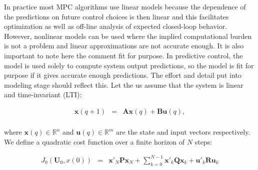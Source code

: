 	\label{BASICCSR:sec:LQR}

In practice most MPC algorithms use linear models because the dependence of the predictions on future control choices is then linear and this facilitates optimization as well as off-line analysis of expected closed-loop behavior. However, nonlinear models can be used where the implied computational burden is not a problem and linear approximations are not accurate enough. It is also important to note here the comment fit for purpose. In predictive control, the model is used solely to compute system output predictions, so the model is fit for purpose if it gives accurate enough predictions. The effort and detail put into modeling stage should reflect this.	Let the us assume that the system is linear and time-invariant (LTI):
	
	    \begin{equation}
        \begin{array}{rcl}
            \textbf{x}(q+1)&=&\textbf{Ax}(q)+\textbf{Bu}(q),\\
        \end{array}
        \label{BASICMPC:equ:basic_LTI}
    \end{equation}

    where $\textbf{x}(q)\in\mathbb{R}^n$ and $\textbf{u}(q)\in\mathbb{R}^m$ are the state and input vectors respectively. We define a quadratic cost function over a finite horizon of $N$ steps:




\begin{equation}
        \begin{array}{rcl}
         J_0(\textbf{U}_0,x(0))&=&\textbf{x}'_N\textbf{P}\textbf{x}_N+\sum^{N-1}_{k=0}\textbf{x}'_k\textbf{Q}\textbf{x}_k+\textbf{u}'_k\textbf{R}\textbf{u}_k\\
        \end{array}
        \label{BASICMPC:equ:cost_function_Euclidian}
    \end{equation}

